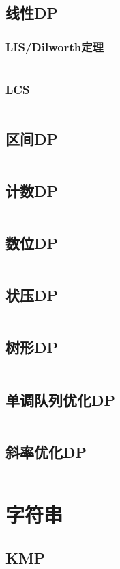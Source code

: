 \documentclass[a4paper,12pt]{article}
\begin{document}
\subsection{线性DP}
\subsubsection{LIS/Dilworth定理}
\inputminted[breaklines, linenos]{c++}{dp/linear/lis.cc}
\subsubsection{LCS}
\inputminted[breaklines, linenos]{c++}{dp/linear/lcs.cc}
\subsection{区间DP}
\inputminted[breaklines, linenos]{c++}{dp/interval.cc}
\subsection{计数DP}
\inputminted[breaklines, linenos]{c++}{dp/jishu.cc}
\subsection{数位DP}
\inputminted[breaklines, linenos]{c++}{dp/shuwei.cc}
\subsection{状压DP}
\inputminted[breaklines, linenos]{c++}{dp/zhuangya.cc}
\subsection{树形DP}
\inputminted[breaklines, linenos]{c++}{dp/treedp.cc}
\subsection{单调队列优化DP}
\inputminted[breaklines, linenos]{c++}{dp/dddl.cc}
\subsection{斜率优化DP}
\inputminted[breaklines, linenos]{c++}{dp/xielv.cc}


\newpage
\section{字符串}
\subsection{KMP}
\inputminted[breaklines, linenos]{c++}{string/kmp.cc}
\end{document}
